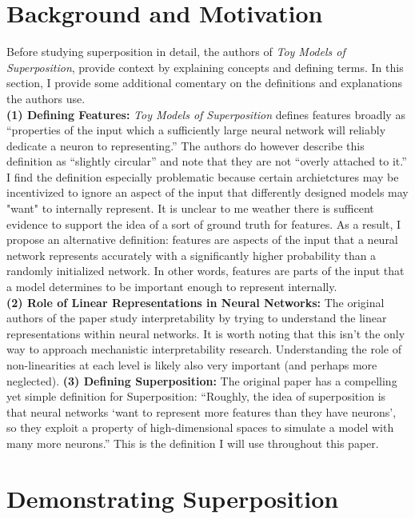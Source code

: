 \documentclass{article} %
\begin{document}
\section{Background and Motivation}

Before studying superposition in detail, the authors of  \textit{Toy Models of Superposition}, 
provide context by explaining concepts and defining terms. In this section, I 
provide some additional comentary on the definitions and explanations the authors use. \\

\textbf{(1) Defining Features: }\textit{Toy Models of Superposition}
defines features broadly as ``properties of the input which a sufficiently large 
neural network will reliably dedicate a neuron to representing.'' The authors do
however describe this definition as ``slightly circular'' and note that they are
not ``overly attached to it.'' I find the definition especially problematic because 
certain archietctures may be incentivized to ignore an aspect of the input that 
differently designed models may "want" to internally represent. It is unclear to me weather
there is sufficent evidence to support the idea of a sort of ground truth for 
features. As a result, I propose an alternative definition: features are aspects 
of the input that a neural network represents accurately with a significantly higher probability than 
a randomly initialized network. In other words, features are parts of the input 
that a model determines to be important enough to represent internally.\\

\textbf{(2) Role of Linear Representations in Neural Networks: }The original authors
of the paper study interpretability by trying to understand the linear representations
within neural networks. It is worth noting that this isn't the only way to approach
mechanistic interpretability research. Understanding the role of non-linearities 
at each level is likely also very important (and perhaps more neglected).\newline\newline
\textbf{(3) Defining Superposition: } The original paper has a compelling yet
simple definition for Superposition: ``Roughly, the idea of 
superposition is that neural networks `want to represent more features than they 
have neurons', so they exploit a property of high-dimensional spaces to 
simulate a model with many more neurons.'' This is the definition I will use
throughout this paper.

\section{Demonstrating Superposition}
\end{document}
